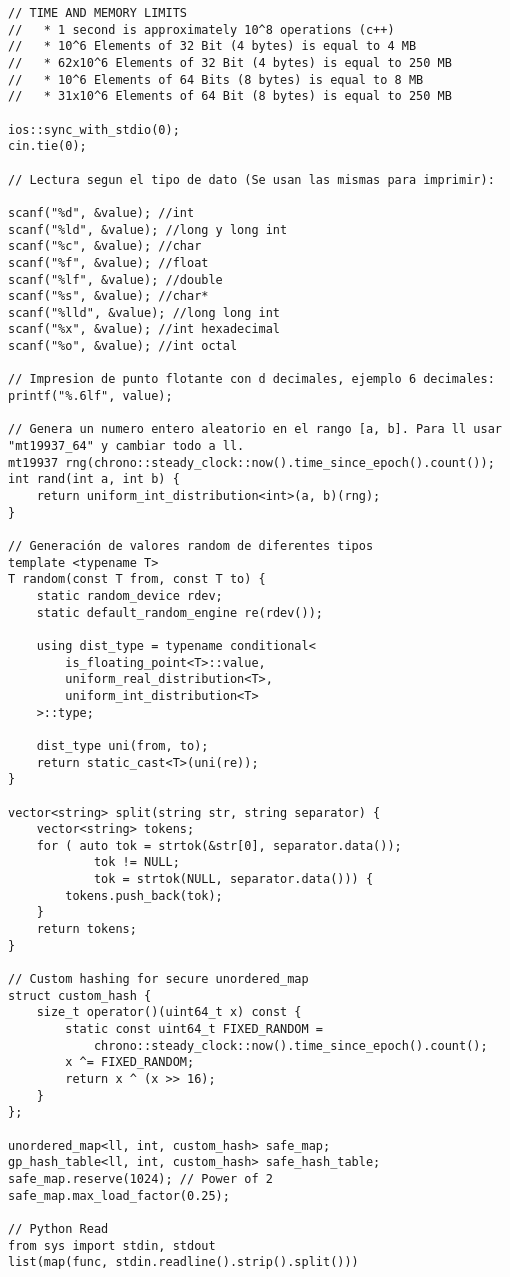 \documentclass[10pt,letterpaper,twocolumn,twosided]{article}
\begin{document}
\begin{lstlisting}
// TIME AND MEMORY LIMITS
//   * 1 second is approximately 10^8 operations (c++)
//   * 10^6 Elements of 32 Bit (4 bytes) is equal to 4 MB
//   * 62x10^6 Elements of 32 Bit (4 bytes) is equal to 250 MB
//   * 10^6 Elements of 64 Bits (8 bytes) is equal to 8 MB
//   * 31x10^6 Elements of 64 Bit (8 bytes) is equal to 250 MB

ios::sync_with_stdio(0);
cin.tie(0);

// Lectura segun el tipo de dato (Se usan las mismas para imprimir):

scanf("%d", &value); //int
scanf("%ld", &value); //long y long int
scanf("%c", &value); //char 
scanf("%f", &value); //float
scanf("%lf", &value); //double
scanf("%s", &value); //char*
scanf("%lld", &value); //long long int
scanf("%x", &value); //int hexadecimal
scanf("%o", &value); //int octal

// Impresion de punto flotante con d decimales, ejemplo 6 decimales:
printf("%.6lf", value);

// Genera un numero entero aleatorio en el rango [a, b]. Para ll usar "mt19937_64" y cambiar todo a ll.
mt19937 rng(chrono::steady_clock::now().time_since_epoch().count());
int rand(int a, int b) {
    return uniform_int_distribution<int>(a, b)(rng);
}

// Generación de valores random de diferentes tipos
template <typename T>
T random(const T from, const T to) {
    static random_device rdev;
    static default_random_engine re(rdev());

    using dist_type = typename conditional<
        is_floating_point<T>::value,
        uniform_real_distribution<T>,
        uniform_int_distribution<T>
    >::type;

    dist_type uni(from, to);
    return static_cast<T>(uni(re));
}

vector<string> split(string str, string separator) {
    vector<string> tokens;
    for ( auto tok = strtok(&str[0], separator.data());
            tok != NULL;
            tok = strtok(NULL, separator.data())) {
        tokens.push_back(tok);
    }
    return tokens;
}

// Custom hashing for secure unordered_map
struct custom_hash {
    size_t operator()(uint64_t x) const {
        static const uint64_t FIXED_RANDOM = 
            chrono::steady_clock::now().time_since_epoch().count();
        x ^= FIXED_RANDOM;
        return x ^ (x >> 16);
    }
};

unordered_map<ll, int, custom_hash> safe_map;
gp_hash_table<ll, int, custom_hash> safe_hash_table;
safe_map.reserve(1024); // Power of 2
safe_map.max_load_factor(0.25);

// Python Read
from sys import stdin, stdout
list(map(func, stdin.readline().strip().split()))
\end{lstlisting}
\end{document}
